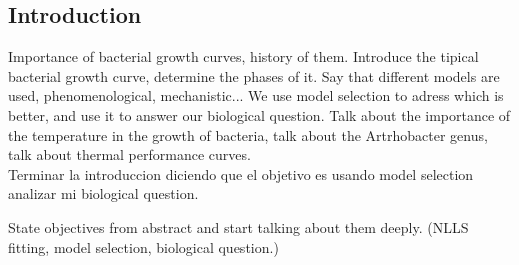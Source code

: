 \documentclass[titlepage,11pt]{article}
\begin{document}
\begin{linenumbers}
    \section{Introduction}\label{sec:introduction}
    Importance of bacterial growth curves, history of them. Introduce the tipical bacterial growth curve, determine the phases of it. Say that different models are used, phenomenological, mechanistic... We use model selection to adress which is better, and use it to answer our biological question. Talk about the importance of the temperature in the growth of bacteria, talk about the Artrhobacter genus,  talk about thermal performance curves.\\
    
   	Terminar la introduccion diciendo que el objetivo es usando model selection analizar mi biological question.
    
    State objectives from abstract and start talking about them deeply. (NLLS fitting, model selection, biological question.)\\
    

\end{linenumbers}
\end{document}
